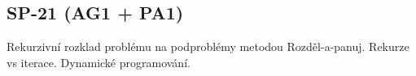 \subsection{SP-21 (AG1 + PA1)}
Rekurzivní rozklad problému na podproblémy metodou Rozděl-a-panuj. Rekurze vs iterace. Dynamické programování.